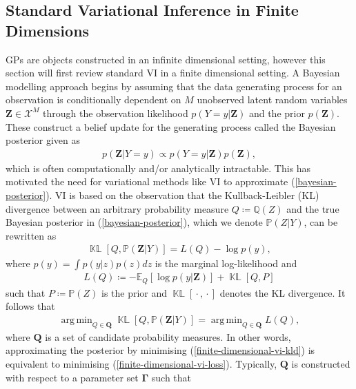 \documentclass{article}
\newcommand{\KLD}{\operatorname{\mathbb{KL}}}
\newcommand{\wc}{\operatorname{{}\cdot{}}}
\DeclareMathOperator*{\argmin}{arg\,min}
\numberwithin{equation}{section}
\begin{document}
\subsection{Standard Variational Inference in Finite Dimensions}\label{section:vi-in-finite-dimensions}
GPs are objects constructed in an infinite dimensional setting, however this section will first review standard VI in a finite dimensional setting.
A Bayesian modelling approach begins by assuming that the data generating process for an observation is conditionally dependent on $M$ unobserved latent random variables $\mathbf{Z} \in \mathcal{X}^M$ through the observation likelihood $p(Y=y\vert \mathbf{Z})$ and the prior $p(\mathbf{Z})$.
These construct a belief update for the generating process called the Bayesian posterior given as
\begin{align}
    p(\mathbf{Z} \vert Y=y) \propto p(Y=y\vert \mathbf{Z})p(\mathbf{Z}),
    \label{bayesian-posterior}
\end{align}
which is often computationally and/or analytically intractable.
This has motivated the need for variational methods like VI to approximate (\ref{bayesian-posterior}).
VI is based on the observation that the Kullback-Leibler (KL) divergence between an arbitrary probability measure $Q \coloneqq \mathbb{Q}(Z)$ and the true Bayesian posterior in (\ref{bayesian-posterior}), which we denote $\mathbb{P}(Z\vert Y)$, can be rewritten as
\begin{align}
    \KLD\left[Q, \mathbb{P}(\mathbf{Z} \vert Y)\right] = L(Q) - \log p(y),
    \label{finite-dimensional-vi-kld}
\end{align}
where $p(y) = \int p(y\vert z)p(z) dz$ is the marginal log-likelihood and
\begin{align}
    L(Q) \coloneqq -\mathbb{E}_{Q}\left[\log p(y \vert \mathbf{Z})\right] + \KLD\left[Q, P\right]
    \label{finite-dimensional-vi-loss}
\end{align}
such that $P \coloneqq \mathbb{P}(Z)$ is the prior and $\KLD\left[\wc, \wc\right]$ denotes the KL divergence.
It follows that
\begin{align}
    \argmin_{Q \in \boldsymbol{Q}} \KLD\left[Q, \mathbb{P}(\mathbf{Z}\vert Y)\right] = \argmin_{Q \in \boldsymbol{Q}} L(Q),
    \label{optimal-approximation-vi}
\end{align}
where $\boldsymbol{Q}$ is a set of candidate probability measures.
In other words, approximating the posterior by minimising (\ref{finite-dimensional-vi-kld}) is equivalent to minimising (\ref{finite-dimensional-vi-loss}). Typically, $\boldsymbol{Q}$ is constructed with respect to a parameter set $\boldsymbol{\Gamma}$ such that
\end{document}
